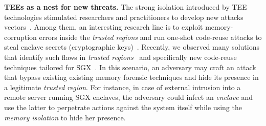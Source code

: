 \vspace{0.5cm}
\noindent \textbf{TEEs as a nest for new threats.}
%
%
The strong isolation introduced by TEE technologies stimulated researchers and 
practitioners to develop new attacks 
vectors~\citep{foreshadow,Murdock2019plundervolt,203183,lee2017hacking}.
Among them, an interesting research line is to exploit memory-corruption 
errors inside the \emph{trusted regions} and run one-shot code-reuse attacks to 
steal enclave secrets (\eg cryptographic keys)~\citep{geometry2007}.
Recently, we observed many solutions that identify such flaws in \emph{trusted 
regions}~\citep{teerex,tale-two-worlds} and specifically new code-reuse 
techniques tailored for SGX~\citep{lee2017hacking,biondo2018guard}.
In this scenario, an adversary may craft an attack that bypass existing 
existing memory forensic techniques and hide its presence in a legitimate 
\emph{trusted region}.
%
For instance, in case of external intrusion into a remote server running SGX 
enclaves, the adversary could infect an \emph{enclave} and use the latter to 
perpetrate actions against the system itself while using the \emph{memory 
isolation} to hide her presence.

